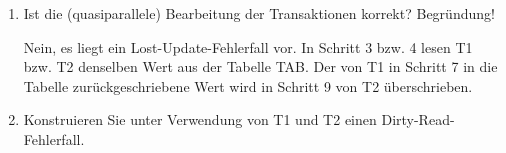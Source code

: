 \documentclass{lehramt-informatik-aufgabe}
\begin{document}
\begin{enumerate}

%

\item Ist die (quasiparallele) Bearbeitung der Transaktionen korrekt?
Begründung!

\begin{liAntwort}
Nein, es liegt ein Lost-Update-Fehlerfall vor. In Schritt 3 bzw. 4
lesen T1 bzw. T2 denselben Wert aus der Tabelle TAB. Der von T1 in
Schritt 7 in die Tabelle zurückgeschriebene Wert wird in Schritt 9 von
T2 überschrieben.
\end{liAntwort}

%

\item Konstruieren Sie unter Verwendung von T1 und T2 einen
Dirty-Read-Fehlerfall.
\end{enumerate}
\end{document}
